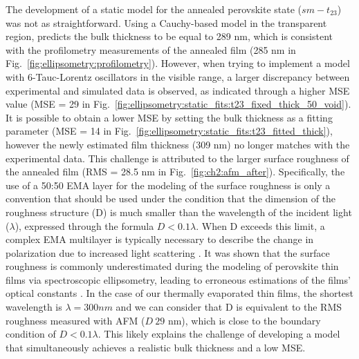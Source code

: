  
The development of a static model for the annealed perovskite state ($sm-t_{\text{23}}$) was not as straightforward. Using a Cauchy-based model in the transparent region, predicts the bulk thickness to be equal to 289 nm, which is consistent with the profilometry measurements of the annealed film (285 nm in Fig.~\ref{fig:ellipsometry:profilometry}). However, when trying to implement a model with 6-Tauc-Lorentz oscillators in the visible range, a larger discrepancy between experimental and simulated data is observed, as indicated through a higher MSE value (MSE = 29 in Fig.~\ref{fig:ellipsometry:static_fits:t23_fixed_thick_50_void}). It is possible to obtain a lower MSE by setting the bulk thickness as a fitting parameter (MSE = 14 in Fig.~\ref{fig:ellipsometry:static_fits:t23_fitted_thick}), however the newly estimated film thickness (309 nm) no longer matches with the experimental data. This challenge is attributed to the larger surface roughness of the annealed film (RMS = 28.5 nm in Fig.~\ref{fig:ch2:afm_after}). Specifically, the use of a 50:50 EMA layer for the modeling of the surface roughness is only a convention that should be used under the condition that the dimension of the roughness structure (D) is much smaller than the wavelength of the incident light ($\lambda$), expressed through the formula $D<0.1\lambda$. When D exceeds this limit, a complex EMA multilayer is typically necessary to describe the change in polarization due to increased light scattering \cite{Akagawa2011High-precisionEllipsometry}. It was shown that the surface roughness is commonly underestimated during the modeling of perovskite thin films via spectroscopic ellipsometry, leading to erroneous estimations of the films' optical constants \cite{Fujiwara2017DeterminationMaterials}. In the case of our thermally evaporated thin films, the shortest wavelength is $\lambda=300 nm$ and we can consider that D is equivalent to the RMS roughness measured with AFM ($D ~ 29$ nm), which is close to the boundary condition of $D<0.1\lambda$. This likely explains the challenge of developing a model that simultaneously achieves a realistic bulk thickness and a low MSE. 


